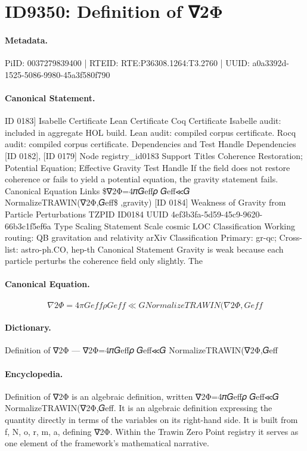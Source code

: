 \section*{ID9350: Definition of ∇2Φ}
\paragraph{Metadata.}
PiID: 0037279839400 | RTEID: RTE:P36308.1264:T3.2760 | UUID: a0a3392d-1525-5086-9980-45a3f580f790

\paragraph{Canonical Statement.}
ID 0183] Isabelle Certificate Lean Certificate Coq Certificate Isabelle audit: included in aggregate HOL build. Lean audit: compiled corpus certificate. Rocq audit: compiled corpus certificate. Dependencies and Test Handle Dependencies [ID 0182], [ID 0179] Node registry\_id0183 Support Titles Coherence Restoration; Potential Equation; Effective Gravity Test Handle If the field does not restore coherence or fails to yield a potential equation, the gravity statement fails. Canonical Equation Links \$∇2Φ=4𝜋𝐺eff𝜌 𝐺eff≪𝐺 NormalizeTRAWIN(∇2Φ,𝐺eff\$ ,gravity) [ID 0184] Weakness of Gravity from Particle Perturbations TZPID ID0184 UUID 4ef3b3fa-5d59-45c9-9620-66b3c1f5ef6a Type Scaling Statement Scale cosmic LOC Classification Working routing: QB gravitation and relativity arXiv Classification Primary: gr-qc; Cross-list: astro-ph.CO, hep-th Canonical Statement Gravity is weak because each particle perturbs the coherence field only slightly. The

\paragraph{Canonical Equation.}
\[
∇2Φ=4𝜋𝐺eff𝜌 𝐺eff≪𝐺 NormalizeTRAWIN(∇2Φ,𝐺eff
\]

\paragraph{Dictionary.}
Definition of ∇2Φ — ∇2Φ=4𝜋𝐺eff𝜌 𝐺eff≪𝐺 NormalizeTRAWIN(∇2Φ,𝐺eff

\paragraph{Encyclopedia.}
Definition of ∇2Φ is an algebraic definition, written ∇2Φ=4𝜋𝐺eff𝜌 𝐺eff≪𝐺 NormalizeTRAWIN(∇2Φ,𝐺eff. It is an algebraic definition expressing the quantity directly in terms of the variables on its right-hand side. It is built from f, N, o, r, m, a, defining ∇2Φ. Within the Trawin Zero Point registry it serves as one element of the framework's mathematical narrative.
